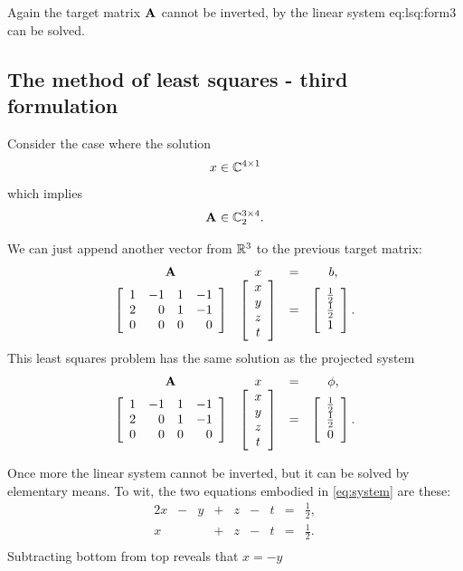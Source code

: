 Again the target matrix $\textbf{A}^{\mathrm{}}$ cannot be inverted, by the linear system {eq:lsq:form3} can be solved.

\subsection{The method of least squares - third formulation}
Consider the case where the solution
\begin{equation}
  x\in\mathbb{C}^{4 \times 1}
\end{equation}
which implies
\begin{equation}
  \textbf{A}^{\mathrm{}} \in \mathbb{C}^{3 \times 4}_{2}.
\end{equation}

We can just append another vector from $\mathbb{R}^{3}$ to the previous target matrix:
\begin{equation}
  \begin{array}{cccc}
    \A{} & x & = & b, \\
    \mat{crcr}{1&-1&1&-1\\2&0&1&-1\\0&0&0&0} & \mat{c}{x\\y\\z\\t} & = &  \mat{c}{\frac{1}{2}\\\frac{1}{2}\\1}.
  \end{array}
  \label{eq:lsq:form4}
\end{equation}
This least squares problem has the same solution as the projected system
\begin{equation}
  \begin{array}{cccc}
    \A{} & x & = & \phi, \\
    \mat{crcr}{1&-1&1&-1\\2&0&1&-1\\0&0&0&0} & \mat{c}{x\\y\\z\\t} & = &  \mat{c}{\frac{1}{2}\\\frac{1}{2}\\0}.
  \end{array}
  \label{eq:system}
\end{equation}
 
Once more the linear system cannot be inverted, but it can be solved by elementary means. To wit, the two equations embodied in \eqref{eq:system} are these:
\begin{equation}
  \begin{array}{ccccccccc}
    2x&-&y&+&z&-&t&=&\frac{1}{2},\\
    x&&&+&z&-&t&=&\frac{1}{2}.\\
  \end{array}
\end{equation}
Subtracting bottom from top reveals that $x=-y$

